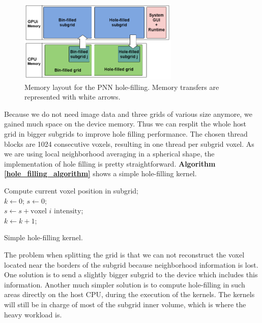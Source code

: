 \documentclass[12pt,journal,compsoc]{IEEEtran}
\begin{document}
\begin{figure}[ht!]
\centering
\includegraphics[width=3.0in]{hole_filling_memory}
\caption{Memory layout for the PNN hole-filling. Memory transfers are represented with white arrows.}
\label{hole_filling_memory}
\end{figure}
 

Because we do not need image data and three grids of various size anymore, we gained much space on the device memory. Thus we can resplit the whole host grid in bigger subgrids to improve hole filling performance. The chosen thread blocks are 1024 consecutive voxels, resulting in one thread per subgrid voxel.
As we are using local neighborhood averaging in a spherical shape, the implementation of hole filling is pretty straightforward. \textbf{Algorithm \ref{hole_filling_algorithm}} shows a simple hole-filling kernel.


\begin{algorithm}
\vspace{0.2cm}
Compute current voxel position in subgrid;\\
$k\gets0$; $s\gets0$;\\
%
{%
{$s\gets s + \text{voxel }i\text{ intensity}$;\\
$k\gets k + 1$;}}

\caption{Simple hole-filling kernel.}
\label{hole_filling_algorithm}
\end{algorithm}

The problem when splitting the grid is that we can not reconstruct the voxel located near the borders of the subgrid because neighborhood information is lost. One solution is to send a slightly bigger subgrid to the device which includes this information. Another much simpler solution is to compute hole-filling in such areas directly on the host CPU, during the execution of the kernels. The kernels will still be in charge of most of the subgrid inner volume, which is where the heavy workload is.
\end{document}
